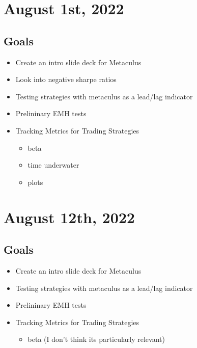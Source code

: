 \documentclass{article}
\begin{document}
\section{August 1st, 2022}
\subsection*{Goals}
\begin{itemize}
    \item Create an intro slide deck for Metaculus
    \item Look into negative sharpe ratios
    \item Testing strategies with metaculus as a lead/lag indicator
    \item Prelininary EMH tests
    \item Tracking Metrics for Trading Strategies
    \begin{itemize}
        \item beta
        \item time underwater
        \item plots
    \end{itemize}

\end{itemize}

\section{August 12th, 2022}
\subsection*{Goals}
\begin{itemize}
    \item Create an intro slide deck for Metaculus
    \item Testing strategies with metaculus as a lead/lag indicator
    \item Prelininary EMH tests
    \item Tracking Metrics for Trading Strategies
    \begin{itemize}
        \item beta (I don't think its particularly relevant)
    \end{itemize}

\end{itemize}
\end{document}
